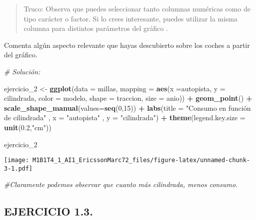 \documentclass[]{article}
\newenvironment{Shaded}{\begin{snugshade}}{\end{snugshade}}
\newcommand{\CommentTok}[1]{\textcolor[rgb]{0.56,0.35,0.01}{\textit{#1}}}
\newcommand{\DataTypeTok}[1]{\textcolor[rgb]{0.13,0.29,0.53}{#1}}
\newcommand{\DecValTok}[1]{\textcolor[rgb]{0.00,0.00,0.81}{#1}}
\newcommand{\FloatTok}[1]{\textcolor[rgb]{0.00,0.00,0.81}{#1}}
\newcommand{\KeywordTok}[1]{\textcolor[rgb]{0.13,0.29,0.53}{\textbf{#1}}}
\newcommand{\NormalTok}[1]{#1}
\newcommand{\OperatorTok}[1]{\textcolor[rgb]{0.81,0.36,0.00}{\textbf{#1}}}
\newcommand{\StringTok}[1]{\textcolor[rgb]{0.31,0.60,0.02}{#1}}
\begin{document}
\begin{quote}
Truco: Observa que puedes seleccionar tanto columnas numéricas como de
tipo carácter o factor. Si lo crees interesante, puedes utilizar la
misma columna para distintos parámetros del gráfico .
\end{quote}

Comenta algún aspecto relevante que hayas descubierto sobre los coches a
partir del gráfico.

\begin{Shaded}
\begin{Highlighting}[]
\CommentTok{# Solución:}

\NormalTok{ejercicio_}\DecValTok{2}\NormalTok{ <-}\StringTok{ }\KeywordTok{ggplot}\NormalTok{(}\DataTypeTok{data =}\NormalTok{ millas, }\DataTypeTok{mapping =} \KeywordTok{aes}\NormalTok{(}\DataTypeTok{x =}\NormalTok{autopista, }\DataTypeTok{y =}\NormalTok{ cilindrada, }\DataTypeTok{color =}\NormalTok{ modelo, }\DataTypeTok{shape =}\NormalTok{ traccion, }\DataTypeTok{size =}\NormalTok{ anio)) }\OperatorTok{+}\StringTok{ }
\StringTok{  }\KeywordTok{geom_point}\NormalTok{() }\OperatorTok{+}
\StringTok{  }\KeywordTok{scale_shape_manual}\NormalTok{(}\DataTypeTok{values=}\KeywordTok{seq}\NormalTok{(}\DecValTok{0}\NormalTok{,}\DecValTok{15}\NormalTok{)) }\OperatorTok{+}
\StringTok{  }\KeywordTok{labs}\NormalTok{(}\DataTypeTok{title =} \StringTok{"Consumo en función de cilindrada"}
\NormalTok{       , }\DataTypeTok{x =} \StringTok{"autopista"}
\NormalTok{       , }\DataTypeTok{y =} \StringTok{"cilindrada"}\NormalTok{) }\OperatorTok{+}
\StringTok{  }\KeywordTok{theme}\NormalTok{(}\DataTypeTok{legend.key.size =} \KeywordTok{unit}\NormalTok{(}\FloatTok{0.2}\NormalTok{,}\StringTok{"cm"}\NormalTok{))}

\NormalTok{ejercicio_}\DecValTok{2}
\end{Highlighting}
\end{Shaded}

\texttt{[image: M1B1T4\_1\_AI1\_EricssonMarc72\_files/figure-latex/unnamed-chunk-3-1.pdf]}

\begin{Shaded}
\begin{Highlighting}[]
\CommentTok{#Claramente podemos observar que cuanto más cilindrada, menos consumo.}
\end{Highlighting}
\end{Shaded}

\hypertarget{ejercicio-1.3.}{%
\subsection{EJERCICIO 1.3.}\label{ejercicio-1.3.}}
\end{document}
